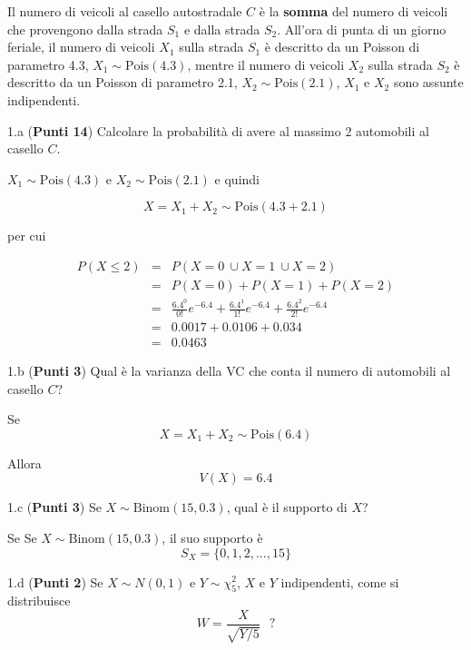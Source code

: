 \documentclass[
  11pt,
]{book}
\theoremstyle{mytheoremstyle}
\theoremstyle{mydefstyle}
\newenvironment{sol}
  {
  \begin{tcolorbox}[enhanced,breakable,arc=0.1mm,boxrule=1pt,colback=white,colframe=iblue,
  title=\bf \fontfamily{lmss}\selectfont \hspace{.5 cm} Soluzione,drop fuzzy shadow]

}{
\end{tcolorbox}
  }
\begin{document}
Il numero di veicoli al casello autostradale \(C\) è la \textbf{somma} del numero di veicoli che provengono dalla strada \(S_1\) e dalla strada \(S_2\). All'ora di punta di un giorno feriale, il numero di veicoli \(X_1\) sulla strada \(S_1\) è descritto da un Poisson di parametro 4.3, \(X_1\sim\text{Pois}(4.3)\), mentre il numero di veicoli \(X_2\) sulla strada \(S_2\) è descritto da un Poisson di parametro 2.1, \(X_2\sim\text{Pois}(2.1)\), \(X_1\) e \(X_2\) sono assunte indipendenti.

1.a (\textbf{Punti 14}) Calcolare la probabilità di avere al massimo 2 automobili al casello \(C\).

\begin{sol}
\(X_1\sim\text{Pois}(4.3)\) e \(X_2\sim\text{Pois}(2.1)\) e quindi

\[
X=X_1+X_2\sim\text{Pois}(4.3+2.1)
\]

per cui

\begin{eqnarray*}
P(X\le 2) &=& P(X=0\ \cup X=1 \ \cup X=2) \\
          &=& P(X=0)+P(X=1)+P(X=2)\\
          &=& \frac{6.4^0}{0!}e^{-6.4}+\frac{6.4^1}{1!}e^{-6.4}+\frac{6.4^2}{2!}e^{-6.4}\\
          &=& 0.0017+0.0106+0.034\\
          &=& 0.0463
\end{eqnarray*}

\end{sol}

1.b (\textbf{Punti 3}) Qual è la varianza della VC che conta il
numero di automobili al casello \(C\)?

\begin{sol}
Se
\[X=X_1+X_2\sim\text{Pois}(6.4)\]

Allora
\[
V(X)=6.4
\]

\end{sol}

1.c (\textbf{Punti 3}) Se \(X\sim\text{Binom}(15,0.3)\), qual è il supporto di \(X\)?

\begin{sol}
Se Se \(X\sim\text{Binom}(15,0.3)\), il suo supporto è
\[S_X=\{0,1,2,...,15\}\]

\end{sol}

1.d (\textbf{Punti 2}) Se \(X\sim N(0,1)\) e \(Y\sim \chi^2_5\),
\(X\) e \(Y\) indipendenti, come si distribuisce
\[W=\frac X {\sqrt{Y/5}} ~~~?\]
\end{document}
